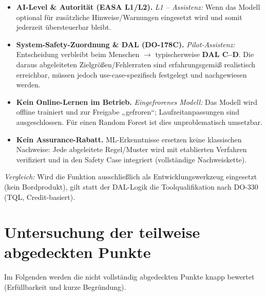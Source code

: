 \begin{itemize}
  \item \textbf{AI-Level \& Autorität (EASA L1/L2).}
        \emph{L1 – Assistenz:} Wenn das Modell optional für zusätzliche Hinweise/Warnungen eingesetzt wird
         und somit jederzeit übersteuerbar bleibt.

  \item \textbf{System-Safety-Zuordnung \& DAL (DO-178C).}
        \emph{Pilot-Assistenz:} Entscheidung verbleibt beim Menschen
        $\rightarrow$ typischerweise \textbf{DAL C–D}.
        Die daraus abgeleiteten Zielgrößen/Fehlerraten sind erfahrungsgemäß realistisch erreichbar,
        müssen jedoch use-case-spezifisch festgelegt und nachgewiesen werden.

  \item \textbf{Kein Online-Lernen im Betrieb.}
        \emph{Eingefrorenes Modell:} Das Modell wird offline trainiert und zur Freigabe „gefroren“;
        Laufzeitanpassungen sind ausgeschlossen. Für einen Random Forest ist dies unproblematisch umsetzbar.

  \item \textbf{Kein Assurance-Rabatt.}
        ML-Erkenntnisse ersetzen keine klassischen Nachweise: Jede abgeleitete Regel/Muster wird
        mit etablierten Verfahren verifiziert und in den Safety Case integriert (vollständige Nachweiskette).
\end{itemize}

\noindent\emph{Vergleich:} Wird die Funktion ausschließlich als Entwicklungswerkzeug eingesetzt (kein Bordprodukt),
gilt statt der DAL-Logik die Toolqualifikation nach DO-330 (TQL, Credit-basiert).



\section{Untersuchung der teilweise abgedeckten Punkte}
Im Folgenden werden die nicht vollständig abgedeckten Punkte knapp bewertet (Erfüllbarkeit und kurze Begründung).

